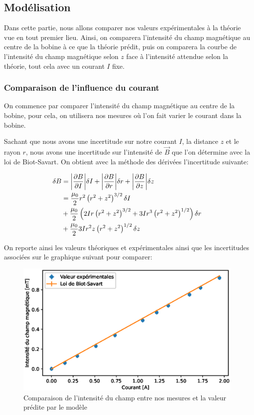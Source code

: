 \documentclass[12pt]{article}
\begin{document}
\newpage

\subsection{Modélisation}
Dans cette partie, nous allons comparer nos valeurs expérimentales à la théorie vue en tout premier lieu. Ainsi,
on comparera l'intensité du champ magnétique au centre de la bobine à ce que la théorie prédit, puis on comparera la courbe
de l'intensité du champ magnétique selon $z$ face à l'intensité attendue selon la théorie, tout cela avec un courant $I$ fixe.

\subsubsection{Comparaison de l'influence du courant}
On commence par comparer l'intensité du champ magnétique au centre de la bobine, pour cela, on utilisera nos mesures où l'on fait varier le courant dans la bobine.

Sachant que nous avons une incertitude sur notre courant $I$, la distance $z$ et le rayon $r$, nous avons une incertitude sur
l'intensité de $\vec{B}$ que l'on détermine avec la loi de Biot-Savart. On obtient avec la méthode des dérivées l'incertitude suivante:

\begin{align*}
    \delta B & = \abs{\frac{\partial B}{\partial I}} \delta I + \abs{\frac{\partial B}{\partial r}} \delta r + \abs{\frac{\partial B}{\partial z}} \delta z \\
    & = \frac{\mu_0}{2} r^2\left(r^2+z^2\right)^{3/2}\delta I \\
    & + \frac{\mu_0}{2} \left( 2Ir\left(r^2 + z^2\right)^{3/2} + 3I r^3\left(r^2 + z^2\right)^{1/2} \right) \delta r \\
    & + \frac{\mu_0}{2} 3Ir^2z\left(r^2+z^2\right)^{1/2} \delta z
\end{align*}

On reporte ainsi les valeurs théoriques et expérimentales ainsi que les incertitudes associées sur le graphique suivant pour comparer:

\begin{figure}[h!]
    \begin{center}
        \includegraphics[scale=0.6]{img/ComparaisonBO.eps}
    \end{center}
    \caption{Comparaison de l'intensité du champ entre nos mesures et la valeur prédite par le modèle}
\end{figure}
\end{document}
